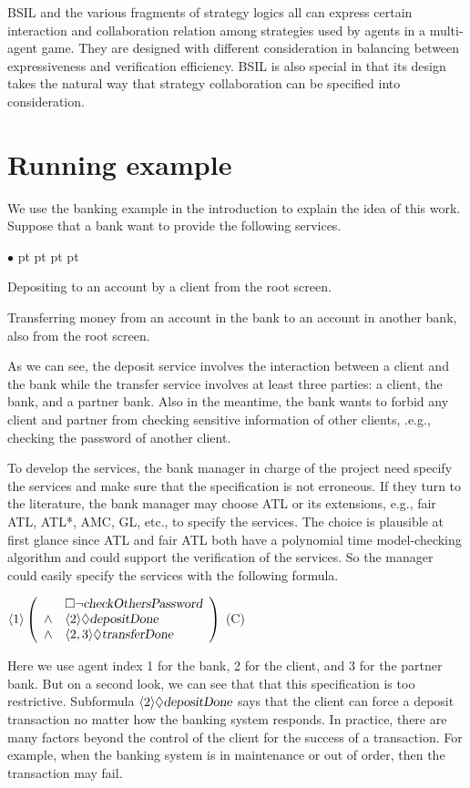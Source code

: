 \documentclass[11pt]{article}
\newcommand{\pfrr}{\Box}
\newcommand{\pevt}{\Diamond}
\newenvironment{list1}{\begin{list}{$\bullet$}
{\topsep 0 pt \parsep 0 pt \partopsep 0 pt \itemsep 0 pt}}{\end{list}}
\begin{document}
\label{reply3.logics.share.notshare} 
BSIL and the various fragments of strategy logics all can express certain 
interaction and collaboration relation among strategies used by agents 
in a multi-agent game. 
They are designed with different consideration in balancing between 
expressiveness and verification efficiency.  
BSIL is also special in that its design takes the natural way that 
strategy collaboration can be specified into consideration.  




\section{Running example\label{sec.running}} 

We use the banking example in the introduction to explain 
the idea of this work. 
Suppose that a bank want to provide the following services. 
\begin{list1} 
\item Depositing to an account by a client from the root screen. 
\item Transferring money from an account in the bank to an account 
  in another bank, also from the root screen. 
\end{list1} 
As we can see, the deposit service involves the interaction 
between a client and the bank while 
the transfer service involves at least three parties:  
a client, the bank, and a partner bank. 
Also in the meantime, the bank wants to forbid any client and partner
from checking sensitive information of other clients, .e.g., 
checking the password of another client.  

To develop the services, the bank manager in charge of the project 
need specify the 
services and make sure that the specification is not erroneous.  
If they turn to the literature, 
the bank manager may choose ATL or its extensions, e.g., 
fair ATL, ATL*, AMC, GL, etc., to specify the services. 
The choice is plausible at first glance since 
ATL and fair ATL both have a polynomial time model-checking algorithm 
and could support the verification of the services. 
So the manager could easily specify the services with 
the following formula. 
\begin{center} \hfill 
$\langle 1\rangle\left(\begin{array}{cl}
		& \pfrr\neg \mbox{\sl checkOthersPassword}\\
\wedge 	& \langle 2\rangle \pevt \mbox{\sl depositDone} \\
\wedge  & \langle 2, 3\rangle\pevt\mbox{\sl transferDone} 
\end{array}\right)$
\hfill (C) 
\end{center}   
Here we use agent index 1 for the bank, 
2 for the client, and 3 for the partner bank. 
But on a second look, we can see that 
that this specification is too restrictive.  
Subformula $\langle 2\rangle\pevt \mbox{\sl depositDone}$ 
says that the client can force a deposit transaction
no matter how the banking system responds. 
In practice, there are many factors beyond the control of the client for the success of a
transaction.  
For example, when the banking system is in maintenance or out of order, 
then the transaction may fail.  
\end{document}
